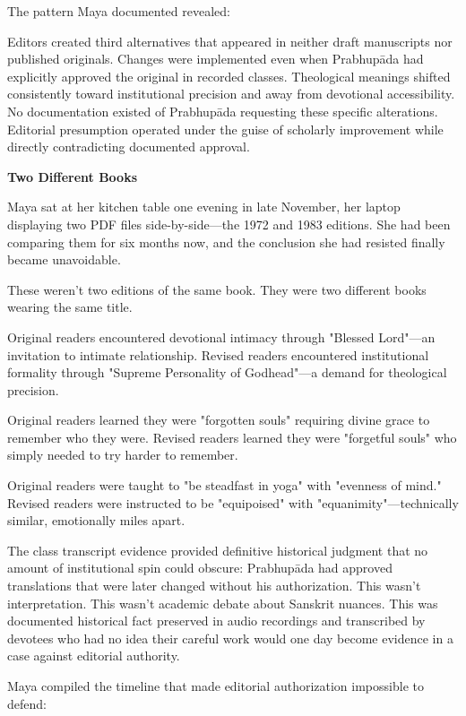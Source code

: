 \documentclass[12pt,twoside]{book}
\begin{document}
The pattern Maya documented revealed:

Editors created third alternatives that appeared in neither draft manuscripts nor published originals. Changes were implemented even when Prabhupāda had explicitly approved the original in recorded classes. Theological meanings shifted consistently toward institutional precision and away from devotional accessibility. No documentation existed of Prabhupāda requesting these specific alterations. Editorial presumption operated under the guise of scholarly improvement while directly contradicting documented approval.


\vspace{0.5cm}
\textbf{Two Different Books}
\vspace{0.2cm}


Maya sat at her kitchen table one evening in late November, her laptop displaying two PDF files side-by-side—the 1972 and 1983 editions. She had been comparing them for six months now, and the conclusion she had resisted finally became unavoidable.

These weren't two editions of the same book. They were two different books wearing the same title.

Original readers encountered devotional intimacy through "Blessed Lord"—an invitation to intimate relationship. Revised readers encountered institutional formality through "Supreme Personality of Godhead"—a demand for theological precision.

Original readers learned they were "forgotten souls" requiring divine grace to remember who they were. Revised readers learned they were "forgetful souls" who simply needed to try harder to remember.

Original readers were taught to "be steadfast in yoga" with "evenness of mind." Revised readers were instructed to be "equipoised" with "equanimity"—technically similar, emotionally miles apart.

The class transcript evidence provided definitive historical judgment that no amount of institutional spin could obscure: Prabhupāda had approved translations that were later changed without his authorization. This wasn't interpretation. This wasn't academic debate about Sanskrit nuances. This was documented historical fact preserved in audio recordings and transcribed by devotees who had no idea their careful work would one day become evidence in a case against editorial authority.

Maya compiled the timeline that made editorial authorization impossible to defend:
\end{document}
